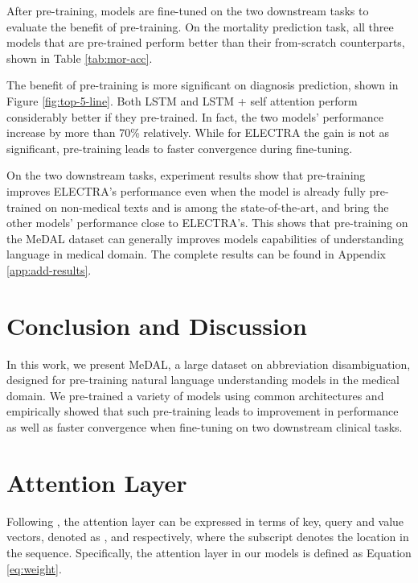 \documentclass[11pt,a4paper]{article}
\begin{document}
After pre-training, models are fine-tuned on the two downstream tasks to evaluate the benefit of pre-training. On the mortality prediction task, all three models that are pre-trained perform better than their from-scratch counterparts, shown in Table \ref{tab:mor-acc}.

The benefit of pre-training is more significant on diagnosis prediction, shown in Figure \ref{fig:top-5-line}. Both LSTM and LSTM + self attention perform considerably better if they pre-trained. In fact, the two models' performance increase by more than 70\% relatively. While for ELECTRA the gain is not as significant, pre-training leads to faster convergence during fine-tuning.

On the two downstream tasks, experiment results show that pre-training improves ELECTRA's performance even when the model is already fully pre-trained on non-medical texts and is among the state-of-the-art, and bring the other models' performance close to ELECTRA's. This shows that pre-training on the MeDAL dataset can generally improves models capabilities of understanding language in medical domain. The complete results can be found in Appendix \ref{app:add-results}.

\section{Conclusion and Discussion}

In this work, we present MeDAL, a large dataset on abbreviation disambiguation, designed for pre-training natural language understanding models in the medical domain. We pre-trained a variety of models using common architectures and empirically showed that such pre-training leads to improvement in performance as well as faster convergence when fine-tuning on two downstream clinical tasks.




\newpage

\appendix

\cleardoublepage
\balance

\section{Attention Layer}\label{app:attention}

Following \citet{Vaswani2017}, the attention layer can be expressed in terms of key, query and value vectors, denoted as ,  and  respectively, where the subscript  denotes the location in the sequence. Specifically, the attention layer in our models is defined as Equation \ref{eq:weight}.
\end{document}
